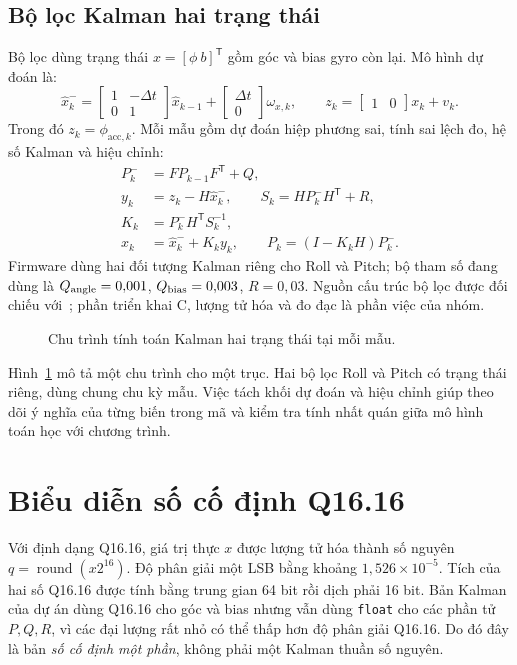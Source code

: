 \documentclass[14pt,a4paper,oneside]{extreport}
\begin{document}
\subsection{Bộ lọc Kalman hai trạng thái}
Bộ lọc dùng trạng thái $x=[\phi\ b]^\mathsf{T}$ gồm góc và bias gyro còn lại. Mô hình dự đoán là:
\begin{equation}\label{eq:kf_state}
\hat x_k^-=
\begin{bmatrix}1&-\Delta t\\0&1\end{bmatrix}\hat x_{k-1}
+\begin{bmatrix}\Delta t\\0\end{bmatrix}\omega_{x,k},
\qquad z_k=\begin{bmatrix}1&0\end{bmatrix}x_k+v_k.
\end{equation}
Trong đó $z_k=\phi_{\mathrm{acc},k}$. Mỗi mẫu gồm dự đoán hiệp phương sai, tính sai lệch đo, hệ số Kalman và hiệu chỉnh:
\begin{align}
P_k^-&=F P_{k-1}F^\mathsf{T}+Q,\\
y_k&=z_k-H\hat x_k^-,\qquad S_k=HP_k^-H^\mathsf{T}+R,\\
K_k&=P_k^-H^\mathsf{T}S_k^{-1},\\
\hat x_k&=\hat x_k^-+K_ky_k,\qquad P_k=(I-K_kH)P_k^-.
\end{align}
Firmware dùng hai đối tượng Kalman riêng cho Roll và Pitch; bộ tham số đang dùng là $Q_{\rm angle}=0{,}001$, $Q_{\rm bias}=0{,}003$, $R=0{,}03$. Nguồn cấu trúc bộ lọc được đối chiếu với~\cite{lauszus}; phần triển khai C, lượng tử hóa và đo đạc là phần việc của nhóm.

\begin{figure}[htbp]\centering

\caption{Chu trình tính toán Kalman hai trạng thái tại mỗi mẫu.}\label{fig:kf}
\end{figure}
Hình~\ref{fig:kf} mô tả một chu trình cho một trục. Hai bộ lọc Roll và Pitch có trạng thái riêng, dùng chung chu kỳ mẫu. Việc tách khối dự đoán và hiệu chỉnh giúp theo dõi ý nghĩa của từng biến trong mã và kiểm tra tính nhất quán giữa mô hình toán học với chương trình.

\section{Biểu diễn số cố định Q16.16}
Với định dạng Q16.16, giá trị thực $x$ được lượng tử hóa thành số nguyên $q=\operatorname{round}(x2^{16})$. Độ phân giải một LSB bằng khoảng $1{,}526\times10^{-5}$. Tích của hai số Q16.16 được tính bằng trung gian 64 bit rồi dịch phải 16 bit. Bản Kalman của dự án dùng Q16.16 cho góc và bias nhưng vẫn dùng \texttt{float} cho các phần tử $P,Q,R$, vì các đại lượng rất nhỏ có thể thấp hơn độ phân giải Q16.16. Do đó đây là bản \emph{số cố định một phần}, không phải một Kalman thuần số nguyên.
\end{document}
